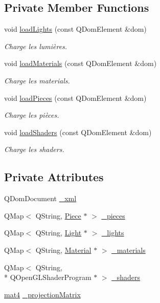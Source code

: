 \subsection*{Private Member Functions}
\begin{DoxyCompactItemize}
\item 
void \hyperlink{class_scene_a34446952ed460f5a66a90649d6f743ec}{load\+Lights} (const Q\+Dom\+Element \&dom)
\begin{DoxyCompactList}\small\item\em Charge les lumières. \end{DoxyCompactList}\item 
void \hyperlink{class_scene_a8fe39b5221775362f28c78129292e162}{load\+Materials} (const Q\+Dom\+Element \&dom)
\begin{DoxyCompactList}\small\item\em Charge les materials. \end{DoxyCompactList}\item 
void \hyperlink{class_scene_aa6d40bab1b160afc7bb84841d056a07d}{load\+Pieces} (const Q\+Dom\+Element \&dom)
\begin{DoxyCompactList}\small\item\em Charge les pièces. \end{DoxyCompactList}\item 
void \hyperlink{class_scene_a1deb5bb022836f4b585c8580246b26cb}{load\+Shaders} (const Q\+Dom\+Element \&dom)
\begin{DoxyCompactList}\small\item\em Charge les shaders. \end{DoxyCompactList}\end{DoxyCompactItemize}
\subsection*{Private Attributes}
\begin{DoxyCompactItemize}
\item 
Q\+Dom\+Document \hyperlink{class_scene_a72a13a904d01e99834ba24ca655b9813}{\+\_\+xml}
\item 
Q\+Map$<$ Q\+String, \hyperlink{class_piece}{Piece} $\ast$ $>$ \hyperlink{class_scene_aa3a488d4be41fe6a187488e1e7a1035c}{\+\_\+pieces}
\item 
Q\+Map$<$ Q\+String, \hyperlink{class_light}{Light} $\ast$ $>$ \hyperlink{class_scene_a0ef33120973d6afc1754d2154d7c338a}{\+\_\+lights}
\item 
Q\+Map$<$ Q\+String, \hyperlink{class_material}{Material} $\ast$ $>$ \hyperlink{class_scene_a5b96810fdeb47632d5ce6c2c47f41691}{\+\_\+materials}
\item 
Q\+Map$<$ Q\+String, \\*
Q\+Open\+G\+L\+Shader\+Program $\ast$ $>$ \hyperlink{class_scene_abde34dc03c8d3a07b3177041ab195f07}{\+\_\+shaders}
\item 
\hyperlink{structmat4}{mat4} \hyperlink{class_scene_a7db3394191c0a07e6bdc456a53ac8ece}{\+\_\+projection\+Matrix}
\end{DoxyCompactItemize}


